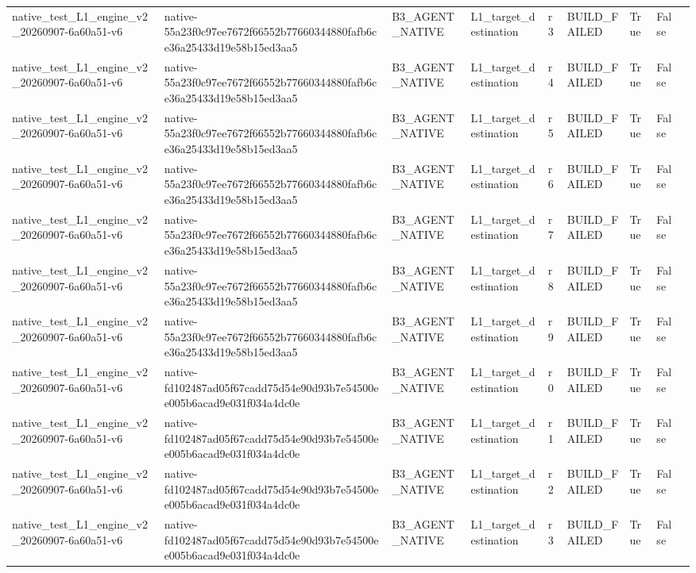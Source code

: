 \begin{tabular}{lllllllll}
native\_test\_L1\_engine\_v2\_20260907-6a60a51-v6 & native-55a23f0c97ee7672f66552b77660344880fafb6ce36a25433d19e58b15ed3aa5 & B3\_AGENT\_NATIVE & L1\_target\_destination & r3 & BUILD\_FAILED & True & False &  \\
native\_test\_L1\_engine\_v2\_20260907-6a60a51-v6 & native-55a23f0c97ee7672f66552b77660344880fafb6ce36a25433d19e58b15ed3aa5 & B3\_AGENT\_NATIVE & L1\_target\_destination & r4 & BUILD\_FAILED & True & False &  \\
native\_test\_L1\_engine\_v2\_20260907-6a60a51-v6 & native-55a23f0c97ee7672f66552b77660344880fafb6ce36a25433d19e58b15ed3aa5 & B3\_AGENT\_NATIVE & L1\_target\_destination & r5 & BUILD\_FAILED & True & False &  \\
native\_test\_L1\_engine\_v2\_20260907-6a60a51-v6 & native-55a23f0c97ee7672f66552b77660344880fafb6ce36a25433d19e58b15ed3aa5 & B3\_AGENT\_NATIVE & L1\_target\_destination & r6 & BUILD\_FAILED & True & False &  \\
native\_test\_L1\_engine\_v2\_20260907-6a60a51-v6 & native-55a23f0c97ee7672f66552b77660344880fafb6ce36a25433d19e58b15ed3aa5 & B3\_AGENT\_NATIVE & L1\_target\_destination & r7 & BUILD\_FAILED & True & False &  \\
native\_test\_L1\_engine\_v2\_20260907-6a60a51-v6 & native-55a23f0c97ee7672f66552b77660344880fafb6ce36a25433d19e58b15ed3aa5 & B3\_AGENT\_NATIVE & L1\_target\_destination & r8 & BUILD\_FAILED & True & False &  \\
native\_test\_L1\_engine\_v2\_20260907-6a60a51-v6 & native-55a23f0c97ee7672f66552b77660344880fafb6ce36a25433d19e58b15ed3aa5 & B3\_AGENT\_NATIVE & L1\_target\_destination & r9 & BUILD\_FAILED & True & False &  \\
native\_test\_L1\_engine\_v2\_20260907-6a60a51-v6 & native-fd102487ad05f67cadd75d54e90d93b7e54500ee005b6acad9e031f034a4dc0e & B3\_AGENT\_NATIVE & L1\_target\_destination & r0 & BUILD\_FAILED & True & False &  \\
native\_test\_L1\_engine\_v2\_20260907-6a60a51-v6 & native-fd102487ad05f67cadd75d54e90d93b7e54500ee005b6acad9e031f034a4dc0e & B3\_AGENT\_NATIVE & L1\_target\_destination & r1 & BUILD\_FAILED & True & False &  \\
native\_test\_L1\_engine\_v2\_20260907-6a60a51-v6 & native-fd102487ad05f67cadd75d54e90d93b7e54500ee005b6acad9e031f034a4dc0e & B3\_AGENT\_NATIVE & L1\_target\_destination & r2 & BUILD\_FAILED & True & False &  \\
native\_test\_L1\_engine\_v2\_20260907-6a60a51-v6 & native-fd102487ad05f67cadd75d54e90d93b7e54500ee005b6acad9e031f034a4dc0e & B3\_AGENT\_NATIVE & L1\_target\_destination & r3 & BUILD\_FAILED & True & False &  \\

\end{tabular}
